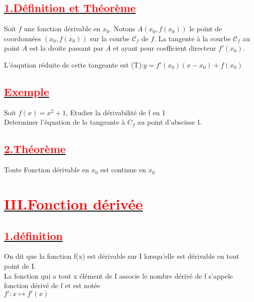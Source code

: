 \documentclass[12pt]{article}
\begin{document}
\subsection*{\underline{\textbf{\textcolor{red}{1.Définition et Théorème}}}}
Soit $f$ une fonction dérivable en $x_0$. Notons $A(x_0, f(x_0))$ le point de coordonnées $(x_0, f(x_0))$ sur la courbe $\mathcal{C}_f$ de $f$. La tangente à la courbe $\mathcal{C}_f$ au point $A$ est la droite passant par $A$ et ayant pour coefficient directeur $f'(x_0)$.\\
L'éaqution réduite de cette tangeante est (T):$y=f'(x_{0})(x-x_{0})+f(x_{0})$
\subsection*{\underline{\textbf{\textcolor{red}{Exemple}}}}
Soit $f(x)=x^{2}+1$, Etudier la dérivabilité de f en 1\\
Determiner l'équation de la tangeante à $C_{f}$ au point d'abscisse 1.\\
\subsection*{\underline{\textbf{\textcolor{red}{2.Théorème}}}}
Toute Fonction dérivable en $x_{0}$ est continue en $x_{0}$
\section*{\underline{\textbf{\textcolor{red}{III.Fonction dérivée}}}}
\subsection*{\underline{\textbf{\textcolor{red}{1.définition}}}}
On dit que la fonction f(x) est dérivable sur I lorsqu'elle est dérivable en tout point de I.\\
La fonction qui a tout x élément de I associe le nombre dérivé de  f s'appele fonction dérivé de f et est notée\\
$f':x\mapsto f'(x)$
\end{document}
